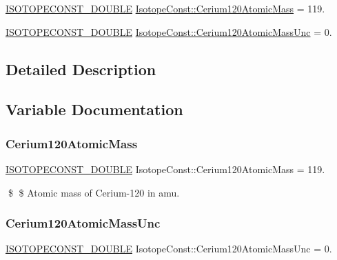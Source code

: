 \begin{DoxyCompactItemize}
\item 
\mbox{\hyperlink{group___isotope_const-_macros_ga8f45a7272ce02c0b4c65c44636ed719a}{I\+S\+O\+T\+O\+P\+E\+C\+O\+N\+S\+T\+\_\+\+D\+O\+U\+B\+LE}} \mbox{\hyperlink{group___isotope_const-_cerium-_ce120_gaf5205f7641bae887d38d4970ec9b5496}{Isotope\+Const\+::\+Cerium120\+Atomic\+Mass}} = 119.
\item 
\mbox{\hyperlink{group___isotope_const-_macros_ga8f45a7272ce02c0b4c65c44636ed719a}{I\+S\+O\+T\+O\+P\+E\+C\+O\+N\+S\+T\+\_\+\+D\+O\+U\+B\+LE}} \mbox{\hyperlink{group___isotope_const-_cerium-_ce120_gad916d319de8083be2fec9f0e67b9fdbf}{Isotope\+Const\+::\+Cerium120\+Atomic\+Mass\+Unc}} = 0.
\end{DoxyCompactItemize}


\subsection{Detailed Description}


\subsection{Variable Documentation}
\mbox{\label{group___isotope_const-_cerium-_ce120_gaf5205f7641bae887d38d4970ec9b5496}} 
\subsubsection{\texorpdfstring{Cerium120\+Atomic\+Mass}{Cerium120AtomicMass}}
{\footnotesize\ttfamily \mbox{\hyperlink{group___isotope_const-_macros_ga8f45a7272ce02c0b4c65c44636ed719a}{I\+S\+O\+T\+O\+P\+E\+C\+O\+N\+S\+T\+\_\+\+D\+O\+U\+B\+LE}} Isotope\+Const\+::\+Cerium120\+Atomic\+Mass = 119.}

\$ \$ Atomic mass of Cerium-\/120 in amu. \mbox{\label{group___isotope_const-_cerium-_ce120_gad916d319de8083be2fec9f0e67b9fdbf}} 
\subsubsection{\texorpdfstring{Cerium120\+Atomic\+Mass\+Unc}{Cerium120AtomicMassUnc}}
{\footnotesize\ttfamily \mbox{\hyperlink{group___isotope_const-_macros_ga8f45a7272ce02c0b4c65c44636ed719a}{I\+S\+O\+T\+O\+P\+E\+C\+O\+N\+S\+T\+\_\+\+D\+O\+U\+B\+LE}} Isotope\+Const\+::\+Cerium120\+Atomic\+Mass\+Unc = 0.}

